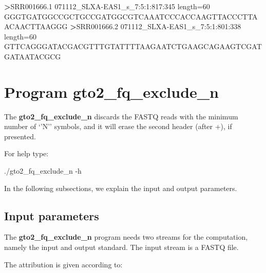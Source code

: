 \documentclass[11pt,]{krantz}
\newenvironment{Shaded}{\begin{snugshade}}{\end{snugshade}}
\newcommand{\OperatorTok}[1]{\textcolor[rgb]{0.43,0.43,0.43}{\textbf{#1}}}
\newcommand{\ExtensionTok}[1]{#1}
\newcommand{\NormalTok}[1]{#1}
\begin{document}
\begin{Shaded}
\begin{Highlighting}[]
\OperatorTok{>}\ExtensionTok{SRR001666.1}\NormalTok{ 071112_SLXA-EAS1_s_7:5:1:817:345 length=60}
\ExtensionTok{GGGTGATGGCCGCTGCCGATGGCGTCAAATCCCACCAAGTTACCCTTAACAACTTAAGGG}
\OperatorTok{>}\ExtensionTok{SRR001666.2}\NormalTok{ 071112_SLXA-EAS1_s_7:5:1:801:338 length=60}
\ExtensionTok{GTTCAGGGATACGACGTTTGTATTTTAAGAATCTGAAGCAGAAGTCGATGATAATACGCG}
\end{Highlighting}
\end{Shaded}

\section{Program gto2\_fq\_exclude\_n}\label{program-gto2_fq_exclude_n}

The \textbf{gto2\_fq\_exclude\_n} discards the FASTQ reads with the
minimum number of `'N'' symbols, and it will erase the second header
(after +), if presented.

For help type:

\begin{Shaded}
\begin{Highlighting}[]
\ExtensionTok{./gto2_fq_exclude_n}\NormalTok{ -h}
\end{Highlighting}
\end{Shaded}

In the following subsections, we explain the input and output
parameters.

\subsection*{Input parameters}\label{input-parameters-2}


The \textbf{gto2\_fq\_exclude\_n} program needs two streams for the
computation, namely the input and output standard. The input stream is a
FASTQ file.

The attribution is given according to:
\end{document}
